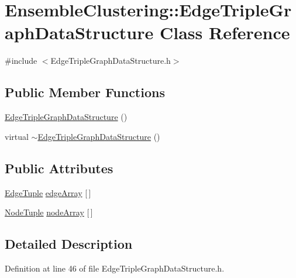 \hypertarget{class_ensemble_clustering_1_1_edge_triple_graph_data_structure}{\section{Ensemble\-Clustering\-:\-:Edge\-Triple\-Graph\-Data\-Structure Class Reference}
\label{class_ensemble_clustering_1_1_edge_triple_graph_data_structure}
}


{\ttfamily \#include $<$Edge\-Triple\-Graph\-Data\-Structure.\-h$>$}

\subsection*{Public Member Functions}
\begin{DoxyCompactItemize}
\item 
\hyperlink{class_ensemble_clustering_1_1_edge_triple_graph_data_structure_a1f82d0cda75658db671f66de46a49bb8}{Edge\-Triple\-Graph\-Data\-Structure} ()
\item 
virtual \hyperlink{class_ensemble_clustering_1_1_edge_triple_graph_data_structure_a01aa98214b549eb747b1e0ed0aebc5f1}{$\sim$\-Edge\-Triple\-Graph\-Data\-Structure} ()
\end{DoxyCompactItemize}
\subsection*{Public Attributes}
\begin{DoxyCompactItemize}
\item 
\hyperlink{class_ensemble_clustering_1_1_edge_tuple}{Edge\-Tuple} \hyperlink{class_ensemble_clustering_1_1_edge_triple_graph_data_structure_a962540d6fb4526ae56bb55435ebbc587}{edge\-Array} \mbox{[}$\,$\mbox{]}
\item 
\hyperlink{class_ensemble_clustering_1_1_node_tuple}{Node\-Tuple} \hyperlink{class_ensemble_clustering_1_1_edge_triple_graph_data_structure_a85cb4ce8c8f92706b3050fbca8c2858d}{node\-Array} \mbox{[}$\,$\mbox{]}
\end{DoxyCompactItemize}


\subsection{Detailed Description}


Definition at line 46 of file Edge\-Triple\-Graph\-Data\-Structure.\-h.



